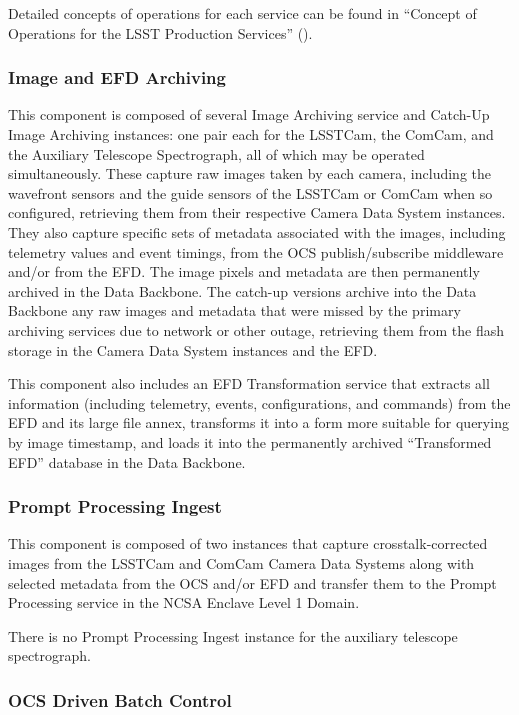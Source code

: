 \documentclass[DM,lsstdraft,toc]{lsstdoc}
\begin{document}
Detailed concepts of operations for each service can be found in
``Concept of Operations for the LSST Production Services'' ().


\subsubsection{Image and EFD Archiving}\label{image-and-efd-archiving}

This component is composed of several Image Archiving service and
Catch-Up Image Archiving instances: one pair each for the LSSTCam, the
ComCam, and the Auxiliary Telescope Spectrograph, all of which may be
operated simultaneously. These capture raw images taken by each camera,
including the wavefront sensors and the guide sensors of the LSSTCam or
ComCam when so configured, retrieving them from their respective Camera
Data System instances. They also capture specific sets of metadata
associated with the images, including telemetry values and event
timings, from the OCS publish/subscribe middleware and/or from the EFD.
The image pixels and metadata are then permanently archived in the Data
Backbone. The catch-up versions archive into the Data Backbone any raw
images and metadata that were missed by the primary archiving services
due to network or other outage, retrieving them from the flash storage
in the Camera Data System instances and the EFD.

This component also includes an EFD Transformation service that extracts
all information (including telemetry, events, configurations, and
commands) from the EFD and its large file annex, transforms it into a
form more suitable for querying by image timestamp, and loads it into
the permanently archived ``Transformed EFD'' database in the Data
Backbone.

\subsubsection{Prompt Processing Ingest}\label{prompt-processing-ingest}

This component is composed of two instances that capture
crosstalk-corrected images from the LSSTCam and ComCam Camera Data
Systems along with selected metadata from the OCS and/or EFD and
transfer them to the Prompt Processing service in the NCSA Enclave Level
1 Domain.

There is no Prompt Processing Ingest instance for the auxiliary
telescope spectrograph.

\subsubsection{OCS Driven Batch Control}\label{ocs-driven-batch-control}
\end{document}
